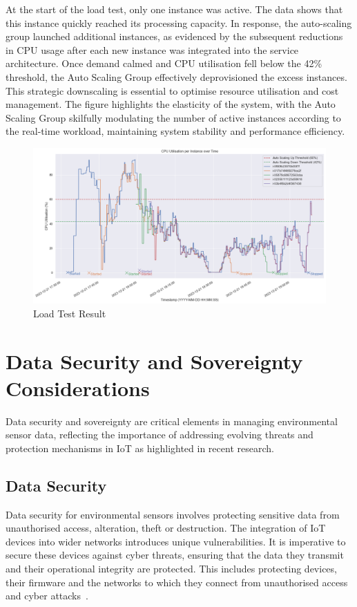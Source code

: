 \documentclass[12pt,oneside]{book} %
\begin{document}
At the start of the load test, only one instance was active. The data shows
that this instance quickly reached its processing capacity. In response, the
auto-scaling group launched additional instances, as evidenced by the
subsequent reductions in CPU usage after each new instance was integrated into
the service architecture. Once demand calmed and CPU utilisation fell below the
42\% threshold, the Auto Scaling Group effectively deprovisioned the excess
instances. This strategic downscaling is essential to optimise resource
utilisation and cost management. The figure highlights the elasticity of the
system, with the Auto Scaling Group skilfully modulating the number of active
instances according to the real-time workload, maintaining system stability and
performance efficiency.

\begin{figure}[H]
    \centering
    \includegraphics[width=1\linewidth]{images/autoscaling-test.png}
    \caption{Load Test Result}\label{fig:load-test-result}
\end{figure}

\newpage
\section{Data Security and Sovereignty Considerations}
Data security and sovereignty are critical elements in managing environmental
sensor data, reflecting the importance of addressing evolving threats and
protection mechanisms in IoT as highlighted in recent research.

\subsection{Data Security}
Data security for environmental sensors involves protecting sensitive data from
unauthorised access, alteration, theft or destruction. The integration of IoT
devices into wider networks introduces unique vulnerabilities. It is imperative
to secure these devices against cyber threats, ensuring that the data they
transmit and their operational integrity are protected. This includes
protecting devices, their firmware and the networks to which they connect from
unauthorised access and cyber attacks~\cite{CurrentResearchIoTSecurity2020}.
\end{document}

